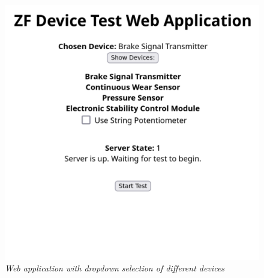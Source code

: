 \documentclass[8pt,compress,aspectratio=169]{beamer}
\begin{document}
\begin{frame}
\begin{minipage}{0.4\textwidth}
\begin{figure}
      \includegraphics[width=\textwidth]{assets/misc/webapp.png}
      \caption{\it Web application with dropdown selection of different devices}
    \end{figure}
  \end{minipage}
\end{frame}
\end{document}
